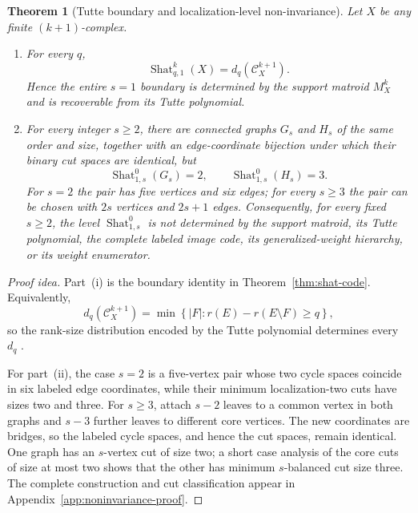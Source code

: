 \documentclass[11pt,letterpaper]{article}
\theoremstyle{plain}
\newtheorem{theorem}{Theorem}[section]
\theoremstyle{definition}
\newcommand{\cC}{\mathcal{C}}
\newcommand{\Shat}{\operatorname{Shat}}
\newcommand{\1}{\mathbf{1}}
\newcommand{\abs}[1]{\left|#1\right|}
\newcommand{\set}[1]{\left\{#1\right\}}
\begin{document}
\begin{theorem}[Tutte boundary and localization-level non-invariance]
\label{thm:tutte-boundary-noninvariance}
Let $X$ be any finite $(k+1)$-complex.
\begin{enumerate}[label=\textup{(\roman*)},leftmargin=*]
\item For every $q$,
\[
 \Shat_{q,1}^k(X)=d_q(\cC_X^{k+1}).
\]
Hence the entire $s=1$ boundary is determined by the support matroid $M_X^k$ and is
recoverable from its Tutte polynomial.
\item For every integer $s\ge2$, there are connected graphs $G_s$ and $H_s$ of the
same order and size, together with an edge-coordinate bijection under which their binary
cut spaces are identical, but
\begin{equation}\label{eq:all-s-noninvariance}
 \Shat_{1,s}^0(G_s)=2,
 \qquad
 \Shat_{1,s}^0(H_s)=3.
\end{equation}
For $s=2$ the pair has five vertices and six edges; for every $s\ge3$ the pair can be
chosen with $2s$ vertices and $2s+1$ edges.  Consequently, for every fixed $s\ge2$, the level $\Shat_{1,s}^0$ is not determined by
the support matroid, its Tutte polynomial, the complete labeled image code, its
generalized-weight hierarchy, or its weight enumerator.
\end{enumerate}
\end{theorem}

\begin{proof}[Proof idea]
Part~(i) is the boundary identity in Theorem~\ref{thm:shat-code}.  Equivalently,
\[
 d_q(\cC_X^{k+1})=
 \min\set{\abs F:r(E)-r(E\setminus F)\ge q},
\]
so the rank-size distribution encoded by the Tutte polynomial determines every $d_q$
\cite{greene1976,britz2007}.

For part~(ii), the case $s=2$ is a five-vertex pair whose two cycle spaces coincide in
six labeled edge coordinates, while their minimum localization-two cuts have sizes two
and three.  For $s\ge3$, attach $s-2$ leaves to a common vertex in both graphs and
$s-3$ further leaves to different core vertices.  The new coordinates are bridges, so
the labeled cycle spaces, and hence the cut spaces, remain identical.  One graph has an
$s$-vertex cut of size two; a short case analysis of the core cuts of size at most two
shows that the other has minimum $s$-balanced cut size three.  The complete construction
and cut classification appear in Appendix~\ref{app:noninvariance-proof}.
\end{proof}
\end{document}
